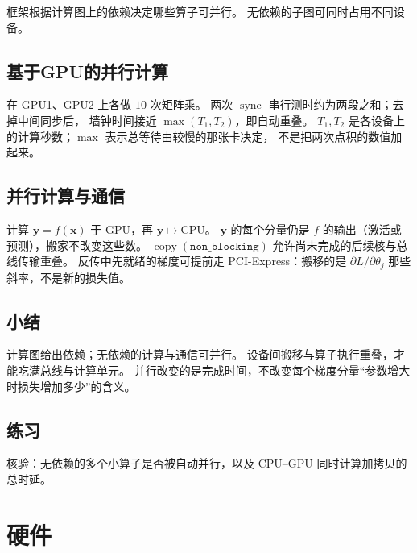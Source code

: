 

框架根据计算图上的依赖决定哪些算子可并行。
无依赖的子图可同时占用不同设备。

\subsection{基于GPU的并行计算}

在 GPU1、GPU2 上各做 $10$ 次矩阵乘。
两次 $\operatorname{sync}$ 串行测时约为两段之和；去掉中间同步后，
墙钟时间接近 $\max(T_1,T_2)$，即自动重叠。
$T_1,T_2$ 是各设备上的计算秒数；$\max$ 表示总等待由较慢的那张卡决定，
不是把两次点积的数值加起来。

\subsection{并行计算与通信}

计算 $\bm{y}=f(\bm{x})$ 于 GPU，再 $\bm{y}\mapsto\mathrm{CPU}$。
$\bm{y}$ 的每个分量仍是 $f$ 的输出（激活或预测），搬家不改变这些数。
$\operatorname{copy}(\texttt{non\_blocking})$ 允许尚未完成的后续核与总线传输重叠。
反传中先就绪的梯度可提前走 PCI-Express：搬移的是 $\partial L/\partial\theta_j$ 那些斜率，不是新的损失值。

\subsection{小结}

计算图给出依赖；无依赖的计算与通信可并行。
设备间搬移与算子执行重叠，才能吃满总线与计算单元。
并行改变的是完成时间，不改变每个梯度分量“参数增大时损失增加多少”的含义。

\subsection{练习}

核验：无依赖的多个小算子是否被自动并行，以及 CPU–GPU 同时计算加拷贝的总时延。

\section{硬件}


